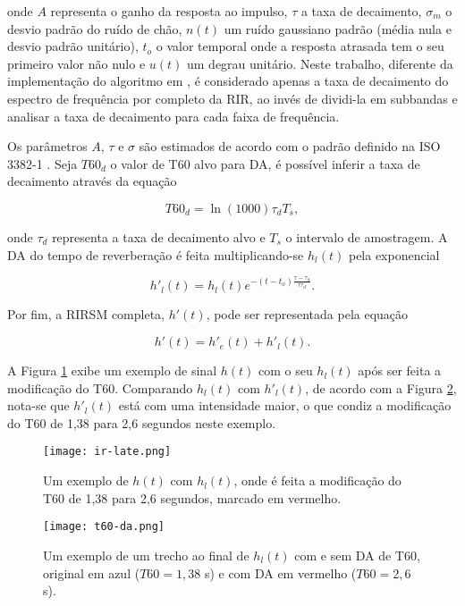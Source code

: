 \noindent
onde $A$ representa o ganho da resposta ao impulso, $\tau$ a taxa de decaimento, $\sigma_m$ o desvio padrão do ruído de chão, 
$n(t)$ um ruído gaussiano padrão (média nula e desvio padrão unitário), $t_o$ o valor temporal onde a resposta atrasada
tem o seu primeiro valor não nulo e $u(t)$ um degrau unitário.
Neste trabalho, diferente da implementação do algoritmo em \cite{RIR_Data_Aug}, é considerado apenas a taxa de decaimento
do espectro de frequência por completo da RIR, ao invés de dividi-la em subbandas e analisar 
a taxa de decaimento para cada faixa de frequência.

Os parâmetros $A$, $\tau$ e $\sigma$ são estimados de acordo com o padrão definido na ISO 3382-1 \cite{ISO-3382}.
Seja $T60_d$ o valor de T60 alvo para DA, é possível inferir a taxa de decaimento através da equação

\begin{equation} \label{eqn:decay-rate-t60}
    T60_d = \ln(1000) \tau_d T_s
    ,
\end{equation}

\noindent
onde $\tau_d$ representa a taxa de decaimento alvo e $T_s$ o intervalo de amostragem.
A DA do tempo de reverberação é feita multiplicando-se $h_l(t)$ pela exponencial

\begin{equation} \label{eqn:DA-T60}
    h'_l(t) = h_l(t) e^{-(t - t_o) \frac{\tau - \tau_d}{ \tau \tau_d} }
    .
\end{equation}

Por fim, a RIRSM completa, $h'(t)$, pode ser representada pela equação

\begin{equation} \label{eqn:RIRSM}
    h'(t) = h'_e(t) + h'_l(t)
    .
\end{equation}

A Figura \ref{fig:ir-late} exibe um exemplo de sinal $h(t)$ com o seu $h_l(t)$ após ser feita a modificação do T60.
Comparando $h_l(t)$ com $h'_l(t)$, de acordo com a Figura \ref{fig:t60-da}, nota-se que $h'_l(t)$  está com uma intensidade 
maior, o que condiz a modificação do T60 de 1,38 para 2,6 segundos neste exemplo.

\begin{figure}[H]
    \centering
    \texttt{[image: ir-late.png]}
    \caption{Um exemplo de $h(t)$ com $h_l(t)$, onde é feita a modificação do T60 de 1,38 para 2,6 segundos, marcado em vermelho.}
    \label{fig:ir-late}
\end{figure} 

\begin{figure}[H]
    \centering
    \texttt{[image: t60-da.png]}
    \caption{Um exemplo de um trecho ao final de $h_l(t)$ com e sem DA de T60, original em azul ($T60=1,38$ s) e com DA em vermelho ($T60=2,6$ s).}
    \label{fig:t60-da}
\end{figure} 